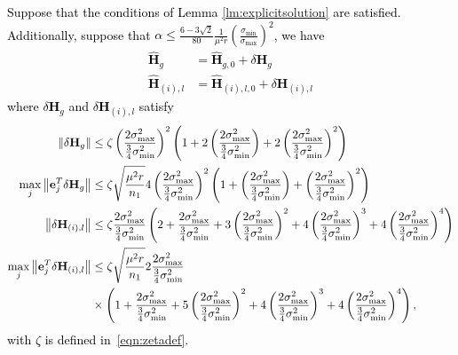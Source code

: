 \documentclass[twoside,11pt]{article}
\newcommand{\revise}[1]{\textcolor{black}{ #1}}
\newcommand{\norm}[1]{\left\lVert#1\right\rVert}
\newcommand{\hmatH}{{\hat{\mathbf{H}}}{}}
\newcommand{\dtmatH}{\delta\mathbf{H}}
\newcommand{\vece}{\mathbf{e}}
\newcommand{\gop}{\sigma_{\max}}
\newcommand{\murnone}{\frac{\mu^2 r}{n_1}}
\newcommand{\sm}{\sigma_{\min}}
\newcommand{\sms}{\sigma_{\min}^2}
\newcommand{\invcnum}{\frac{\sm}{\gop}}
\newcommand{\tkappa}{\frac{2\gop^2}{\frac{3}{4}\sms}}
\newcommand{\brtkappa}{\left(\frac{2\gop^2}{\frac{3}{4}\sms}\right)}
\begin{document}
\revise{\begin{lemma}
\label{lm:usimpleexpansion}
Suppose that the conditions of Lemma \ref{lm:explicitsolution} are satisfied. Additionally, suppose that
$
\alpha\le \frac{6-3\sqrt{2}}{80}\frac{1}{\mu^2r}\left(\invcnum\right)^2
$, we have
\begin{align}
    \hmatH_g &= \hmatH_{g,0}+\dtmatH_g\nonumber\\
    \hmatH_{(i),l} &= \hmatH_{(i),l,0}+\dtmatH_{(i),l}\nonumber
\end{align}
where $\dtmatH_{g}$ and $\dtmatH_{(i),l}$ satisfy
\begin{align}
    \label{eqn:deltaugfnorm}
\norm{\dtmatH_g} &\le \zeta\left(\frac{2\gop^2}{\frac{3}{4}\sms}\right)^2\left(1+2\left(\frac{2\gop^2}{\frac{3}{4}\sms}\right)+2\left(\frac{2\gop^2}{\frac{3}{4}\sms}\right)^2\right)\\
\label{eqn:deltauginfnorm}
\max_j\norm{\vece_j^T\dtmatH_g} &\le \zeta\sqrt{\frac{\mu^2 r}{n_1}}4\left(\frac{2\gop^2}{\frac{3}{4}\sms}\right)^2\left(1+\left(\frac{2\gop^2}{\frac{3}{4}\sms}\right)+\left(\frac{2\gop^2}{\frac{3}{4}\sms}\right)^2\right)\\
\label{eqn:deltaulfnorm}
\norm{\dtmatH_{(i),l}} &\le \zeta \tkappa\left(2+\tkappa+3\brtkappa^2+4\brtkappa^3+4\brtkappa^4\right)\\
\label{eqn:deltaulinfnorm}
\max_j\norm{\vece_j^T\dtmatH_{(i),l}} &\le \zeta \sqrt{\murnone} 2\tkappa\notag\\
&\times\left(1+\tkappa+5\brtkappa^2+4\brtkappa^3+4\brtkappa^4\right) ,
\end{align}
with $\zeta$ is defined in~\eqref{eqn:zetadef}.
\end{lemma}}
\end{document}
